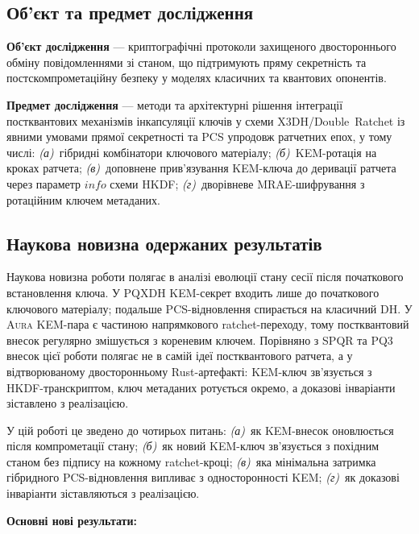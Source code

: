 \documentclass[11pt,a4paper]{article}
\theoremstyle{definition}
\newcommand{\Aura}{\mbox{\normalfont\scshape Aura}}
\newcommand{\PQXDH}{\textsf{PQXDH}}
\newcommand{\SPQR}{\textsf{SPQR}}
\newcommand{\PQThree}{\textsf{PQ3}}
\begin{document}
\subsection{Об'єкт та предмет дослідження}\label{sec:object}

\textbf{Об'єкт дослідження} — криптографічні протоколи захищеного
двостороннього обміну повідомленнями зі станом, що підтримують пряму
секретність та постскомпрометаційну безпеку у моделях класичних та
квантових опонентів.

\textbf{Предмет дослідження} — методи та архітектурні рішення інтеграції
постквантових механізмів інкапсуляції ключів у схеми X3DH/Double~Ratchet
із явними умовами прямої секретності та PCS упродовж ратчетних епох,
у тому числі: \emph{(а)}~гібридні комбінатори ключового матеріалу;
\emph{(б)}~KEM-ротація на кроках ратчета; \emph{(в)}~доповнене
прив'язування KEM-ключа до деривації ратчета через параметр $\mathit{info}$
схеми HKDF; \emph{(г)}~дворівневе MRAE-шифрування з ротаційним ключем
метаданих.

\subsection{Наукова новизна одержаних результатів}\label{sec:novelty}

Наукова новизна роботи полягає в аналізі еволюції стану сесії після
початкового встановлення ключа. У \PQXDH{} KEM-секрет входить лише до
початкового ключового матеріалу; подальше PCS-відновлення спирається на
класичний DH. У \Aura{} KEM-пара є частиною напрямкового ratchet-переходу,
тому постквантовий внесок регулярно змішується з кореневим ключем.
Порівняно з \SPQR{} та \PQThree{} внесок цієї роботи полягає не в самій
ідеї постквантового ратчета, а у відтворюваному двосторонньому
Rust-артефакті: KEM-ключ зв'язується з HKDF-транскриптом, ключ метаданих
ротується окремо, а доказові інваріанти зіставлено з реалізацією.

У цій роботі це зведено до чотирьох питань: \emph{(а)}~як KEM-внесок
оновлюється після компрометації стану; \emph{(б)}~як новий KEM-ключ
зв'язується з похідним станом без підпису на кожному ratchet-кроці;
\emph{(в)}~яка мінімальна затримка гібридного PCS-відновлення випливає з
односторонності KEM; \emph{(г)}~як доказові інваріанти зіставляються з
реалізацією.

\medskip
\noindent\textbf{Основні нові результати:}
\end{document}
